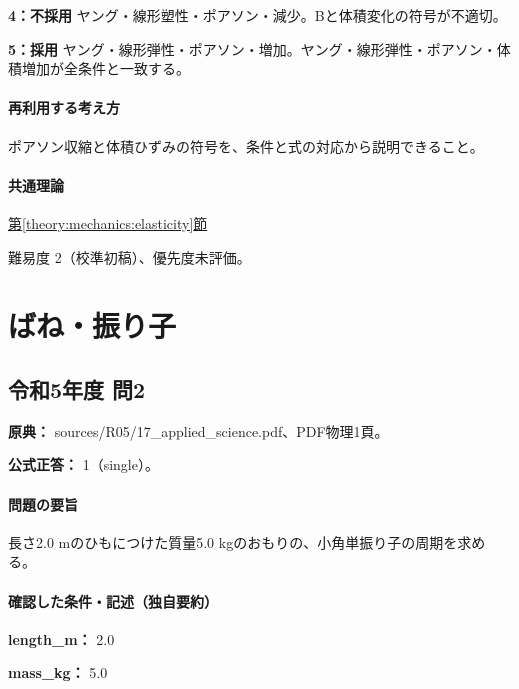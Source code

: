\noindent\textbf{4：不採用} ヤング・線形塑性・ポアソン・減少。Bと体積変化の符号が不適切。\par

\noindent\textbf{5：採用} ヤング・線形弾性・ポアソン・増加。ヤング・線形弾性・ポアソン・体積増加が全条件と一致する。\par

\paragraph{再利用する考え方} ポアソン収縮と体積ひずみの符号を、条件と式の対応から説明できること。

\paragraph{共通理論} \hyperref[theory:mechanics:elasticity]{第\ref*{theory:mechanics:elasticity}節}

\par 難易度 2（校準初稿）、優先度未評価。

\section{ばね・振り子}

\subsection{令和5年度 問2}
\label{q:r05-reg-applied-02}

\noindent\textbf{原典：} sources/R05/17\_applied\_science.pdf、PDF物理1頁。

\textbf{公式正答：} 1（single）。

\paragraph{問題の要旨} 長さ2.0 mのひもにつけた質量5.0 kgのおもりの、小角単振り子の周期を求める。

\paragraph{確認した条件・記述（独自要約）}\mbox{}\par

\noindent\textbf{length\_m：} 2.0\par

\noindent\textbf{mass\_kg：} 5.0\par

